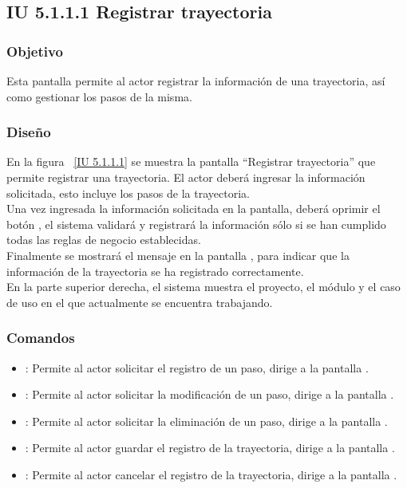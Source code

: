 \newpage 
\subsection{IU 5.1.1.1 Registrar trayectoria}

\subsubsection{Objetivo}
	
	Esta pantalla permite al actor registrar la información de una trayectoria, así como gestionar los pasos de la misma.

\subsubsection{Diseño}

    En la figura ~\ref{IU 5.1.1.1} se muestra la pantalla ``Registrar trayectoria'' que permite registrar una trayectoria. El actor deberá ingresar la información solicitada, esto incluye los pasos de la trayectoria.\\
    
    
    Una vez ingresada la información solicitada en la pantalla, deberá oprimir el botón 
    , el sistema validará y registrará la información sólo si se han cumplido todas las reglas de negocio establecidas.  \\
    
    Finalmente se mostrará el mensaje  en la pantalla , para indicar que la información de la trayectoria se ha registrado correctamente.\\
	
	En la parte superior derecha, el sistema muestra el proyecto, el módulo y el caso de uso en el que actualmente se encuentra trabajando.
	     



\subsubsection{Comandos}
\begin{itemize}
	\item \btnRegistrar: Permite al actor solicitar el registro de un paso, dirige a la pantalla .
	\item \btnEditar[Modificar]: Permite al actor solicitar la modificación de un paso, dirige a la pantalla .
	\item \btnEliminar[Eliminar]: Permite al actor solicitar la eliminación de un paso, dirige a la pantalla .
	\item {}: Permite al actor guardar el registro de la trayectoria, dirige a la pantalla .
	\item {}: Permite al actor cancelar el registro de la trayectoria, dirige a la pantalla .
\end{itemize}

